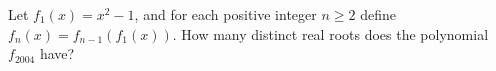 Let \(f_1(x)=x^2-1\), and for each positive integer \(n \geq 2\) define \(f_n(x) = f_{n-1}(f_1(x))\). How many distinct real roots does the polynomial \(f_{2004}\) have?